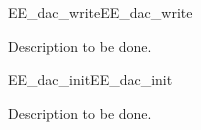 \begin{function_nopb2}{EE\_dac\_write}{EE_dac_write}
  
  \begin{fundescription}
    Description to be done. 
  \end{fundescription}
  
\begin{funparameters}
\end{funparameters}
  
\begin{funreturn}
\end{funreturn}
  
\end{function_nopb2}

\begin{function_nopb2}{EE\_dac\_init}{EE_dac_init}
  
  \begin{fundescription}
    Description to be done. 
  \end{fundescription}
\end{function_nopb2}
